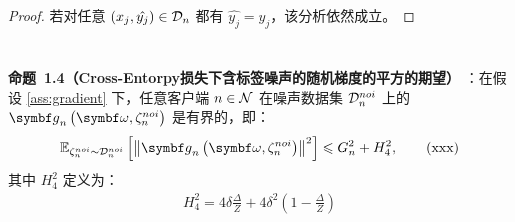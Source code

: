 \begin{proof}
\noindent 若对任意 $\left(x_j,\hat{y_j}\right)\in\mathcal{D}_n$ 都有 $\hat{y_j}=y_j$，该分析依然成立。
\end{proof}
\section{}\label{app:pro4}
\noindent \textbf{命题~1.4（Cross-Entorpy损失下含标签噪声的随机梯度的平方的期望）}
：在假设 \ref{ass:gradient} 下，任意客户端 $n\in\mathcal{N}$ 在噪声数据集 $\mathcal{D}^{noi}_n$ 上的 $\gb_n\left(\omegab,\zetanoi_n\right)$ 是有界的，即：
\begin{equation}
    \mathbb{E}_{\zetanoi_n\sim \Dnoi_n}\left[\left\Vert \gb_n\left(\omegab, \zetanoi_n\right) \right\Vert^2\right] \leq G_n^2 + H_4^2,
    \tag{xxx}
\end{equation}
其中 $H_4^2$ 定义为：
\begin{align}\label{eq:H4}
    H_4^2 = 4\delta\frac{\Delta}{Z}+4\delta^2\left(1-\frac{\Delta}{Z}\right)
    \tag{xxx}
\end{align}

